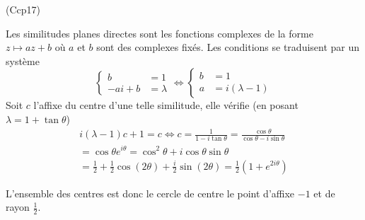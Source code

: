 \begin{tiny}(Ccp17)\end{tiny} Les similitudes planes directes sont les fonctions complexes de la forme $z\mapsto az +b$ où $a$ et $b$ sont des complexes fixés. Les conditions se traduisent par un système
\begin{displaymath}
  \left\lbrace 
  \begin{aligned}
    b&= 1 \\ -ai + b &= \lambda
  \end{aligned}
\right. \Leftrightarrow
  \left\lbrace 
  \begin{aligned}
    b&= 1 \\ a &= i(\lambda-1)
  \end{aligned} \right.
\end{displaymath}
Soit $c$ l'affixe du centre d'une telle similitude, elle vérifie (en posant $\lambda = 1 +\tan \theta$)
\begin{multline*}
  i(\lambda -1) c +1= c \Leftrightarrow c = \frac{1}{1-i\tan \theta} = \frac{\cos \theta}{\cos \theta -i\sin \theta}\\
  = \cos \theta e^{i\theta} = \cos^2 \theta + i\cos \theta \sin \theta\\
  = \frac{1}{2} + \frac{1}{2}\cos(2\theta) +\frac{i}{2} \sin(2\theta)
  = \frac{1}{2}(1+e^{2i\theta})
\end{multline*}

L'ensemble des centres est donc le cercle de centre le point d'affixe $-1$ et de rayon $\frac{1}{2}$.
